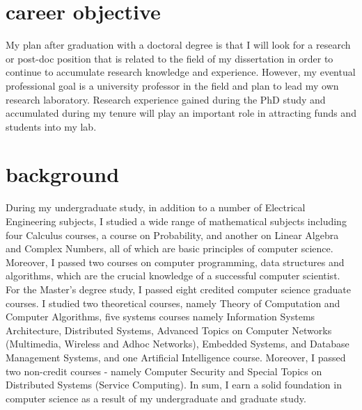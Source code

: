 \documentclass[a4paper,10pt]{report}
\begin{document}
\section{career objective}
My plan after graduation with a doctoral degree is that I will look for a research or post-doc position that is related to the field of my dissertation in order to continue to accumulate research knowledge and experience. However, my eventual professional goal is a university professor in the field and plan to lead my own research laboratory. Research experience gained during the PhD study and accumulated during my tenure will play an important role in attracting funds and students into my lab.
\section{background}
During my undergraduate study, in addition to a number of Electrical Engineering subjects, I studied a wide range of mathematical subjects including four Calculus courses, a course on Probability, and another on Linear Algebra and Complex Numbers, all of which are basic principles of computer science. Moreover, I passed two courses on computer programming, data structures and algorithms, which are the crucial knowledge of a successful computer scientist. For the Master's degree study, I passed eight credited computer science graduate courses. I studied two theoretical courses, namely Theory of Computation and Computer Algorithms, five systems courses namely Information Systems Architecture, Distributed Systems, Advanced Topics on Computer Networks (Multimedia, Wireless and Adhoc Networks), Embedded Systems, and Database Management Systems, and one Artificial Intelligence course. Moreover, I passed two non-credit courses - namely Computer Security and Special Topics on Distributed Systems (Service Computing). In sum, I earn a solid foundation in computer science as a result of my undergraduate and graduate study. 
\end{document}
